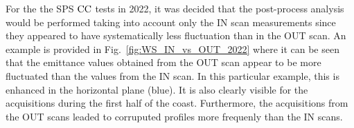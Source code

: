 For the the SPS ${\mathrm{CC}}$ tests in 2022, it was decided that the post-process analysis would be performed taking into account only the IN scan measurements since they appeared to have systematically less fluctuation than in the OUT scan. An example is provided in Fig.~\ref{fig:WS_IN_vs_OUT_2022} where it can be seen that the emittance values obtained from the OUT scan appear to be more fluctuated than the values from the IN scan. In this particular example, this is enhanced in the horizontal plane (blue). It is also clearly visible for the acquisitions during the first half of the coast. Furthermore, the acquisitions from the OUT scans leaded to corruputed profiles more frequenly than the IN scans.










